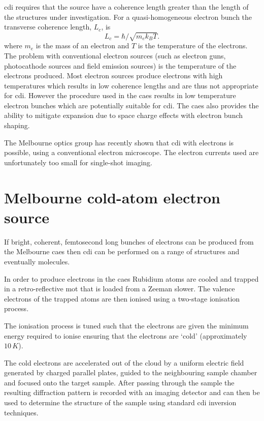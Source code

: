 \Gls{cdi} requires that the source have a coherence length greater than the length of the structures under investigation. For a quasi-homogeneous electron bunch the transverse coherence length, $L_c$, is\cite{van_oudheusden_electron_2007}
\begin{equation}
L_c = \hbar/\sqrt{m_e k_B T}.
\end{equation}
where $m_e$ is the mass of an electron and $T$ is the temperature of the electrons. The problem with conventional electron sources (such as electron guns, photocathode sources and field emission sources) is the temperature of the electrons produced. Most electron sources produce electrons with high temperatures which results in low coherence lengths and are thus not appropriate for \gls{cdi}. However the procedure used in the \gls{caes} results in low temperature electron bunches which are potentially suitable for \gls{cdi}. The \gls{caes} also provides the ability to mitigate expansion due to space charge effects with electron bunch shaping\cite{mcculloch_arbitrarily_2011}.

The Melbourne optics group has recently shown that \gls{cdi} with electrons is possible, using a conventional electron microscope\cite{putkunz_atom-scale_2012}. The electron currents used are unfortunately too small for single-shot imaging.

\section{Melbourne cold-atom electron source}

If bright, coherent, femtosecond long bunches of electrons can be produced from the Melbourne \gls{caes} then \gls{cdi} can be performed on a range of structures and eventually molecules.

In order to produce electrons in the \gls{caes} Rubidium atoms are cooled and trapped in a retro-reflective \gls{mot} that is loaded from a Zeeman slower\cite{phillips_laser_1982, phillips_cooling_1987, bell_slow_2010}. The valence electrons of the trapped atoms are then ionised using a two-stage ionisation process.

The ionisation process is tuned such that the electrons are given the minimum energy required to ionise ensuring that the electrons are `cold' (approximately $10\,\unit{K}$\cite{mcculloch_arbitrarily_2011}).

The cold electrons are accelerated out of the cloud by a uniform electric field generated by charged parallel plates, guided to the neighbouring sample chamber and focused onto the target sample. After passing through the sample the resulting diffraction pattern is recorded with an imaging detector and can then be used to determine the structure of the sample using standard \gls{cdi} inversion techniques.

